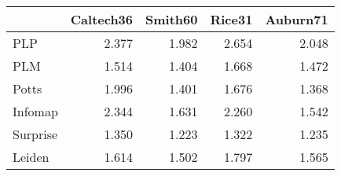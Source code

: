 \begin{tabular}{lrrrr}
\toprule
{} & Caltech36 & Smith60 & Rice31 & Auburn71 \\
\midrule
PLP      &     2.377 &   1.982 &  2.654 &    2.048 \\
PLM      &     1.514 &   1.404 &  1.668 &    1.472 \\
Potts    &     1.996 &   1.401 &  1.676 &    1.368 \\
Infomap  &     2.344 &   1.631 &  2.260 &    1.542 \\
Surprise &     1.350 &   1.223 &  1.322 &    1.235 \\
Leiden   &     1.614 &   1.502 &  1.797 &    1.565 \\
\bottomrule
\end{tabular}
